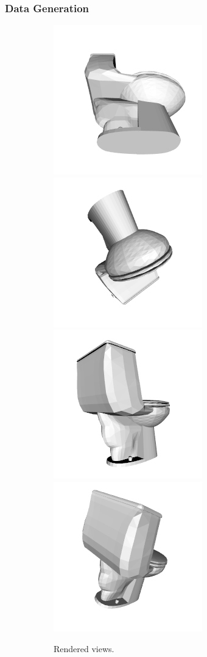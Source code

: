 \subsubsection{Data Generation}

\begin{figure}[!b]
  \centering
  \begin{subfigure}{\linewidth}
    \includegraphics[width=0.24\linewidth]{Figures/ObjRecog/toilet_0_view}
    \includegraphics[width=0.24\linewidth]{Figures/ObjRecog/toilet_1_view}
    \includegraphics[width=0.24\linewidth]{Figures/ObjRecog/toilet_2_view}
    \includegraphics[width=0.24\linewidth]{Figures/ObjRecog/toilet_3_view}
    \caption{Rendered views.}
    \label{fig:objrecog:dataproc:renders}
  \end{subfigure}
  \begin{subfigure}{0.32\linewidth}

\end{subfigure}
\end{figure}
